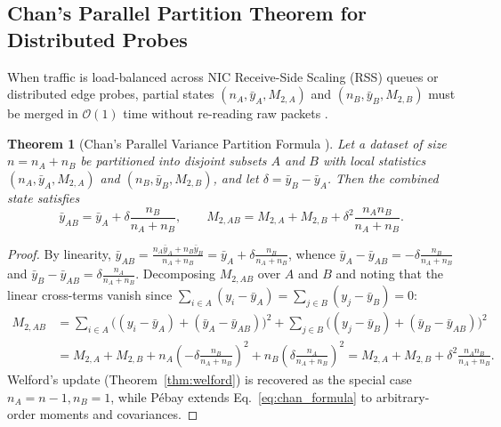 \documentclass[oneside,noexaminfo,english]{sapthesis}
\numberwithin{equation}{section}
\numberwithin{figure}{section}
\numberwithin{table}{section}
\theoremstyle{compactplain}
\newtheorem{theorem}{Theorem}[section]
\theoremstyle{compactdef}
\theoremstyle{compactrem}
\begin{document}
\subsection{Chan's Parallel Partition Theorem for Distributed Probes}
When traffic is load-balanced across NIC Receive-Side Scaling (RSS) queues or distributed edge probes, partial states $(n_A, \bar{y}_A, M_{2,A})$ and $(n_B, \bar{y}_B, M_{2,B})$ must be merged in $\mathcal{O}(1)$ time without re-reading raw packets \cite{chan1983,pebay2008}.

\begin{theorem}[Chan's Parallel Variance Partition Formula \cite{chan1983}]
\label{thm:chan}
Let a dataset of size $n = n_A + n_B$ be partitioned into disjoint subsets $A$ and $B$ with local statistics $(n_A, \bar{y}_A, M_{2,A})$ and $(n_B, \bar{y}_B, M_{2,B})$, and let $\delta = \bar{y}_B - \bar{y}_A$. Then the combined state satisfies
\begin{equation}
    \label{eq:chan_formula}
    \bar{y}_{AB} = \bar{y}_A + \delta \frac{n_B}{n_A + n_B}, \qquad
    M_{2,AB} = M_{2,A} + M_{2,B} + \delta^2 \frac{n_A n_B}{n_A + n_B}.
\end{equation}
\end{theorem}
\begin{proof}
By linearity, $\bar{y}_{AB} = \frac{n_A \bar{y}_A + n_B \bar{y}_B}{n_A + n_B} = \bar{y}_A + \delta\frac{n_B}{n_A + n_B}$, whence $\bar{y}_A - \bar{y}_{AB} = -\delta\frac{n_B}{n_A+n_B}$ and $\bar{y}_B - \bar{y}_{AB} = \delta\frac{n_A}{n_A+n_B}$. Decomposing $M_{2,AB}$ over $A$ and $B$ and noting that the linear cross-terms vanish since $\sum_{i \in A}(y_i - \bar{y}_A) = \sum_{j \in B}(y_j - \bar{y}_B) = 0$:
\begin{align*}
    M_{2,AB} &= \sum_{i \in A}\bigl((y_i - \bar{y}_A) + (\bar{y}_A - \bar{y}_{AB})\bigr)^2 + \sum_{j \in B}\bigl((y_j - \bar{y}_B) + (\bar{y}_B - \bar{y}_{AB})\bigr)^2 \\
    &= M_{2,A} + M_{2,B} + n_A\left(-\delta\frac{n_B}{n_A+n_B}\right)^2 + n_B\left(\delta\frac{n_A}{n_A+n_B}\right)^2 = M_{2,A} + M_{2,B} + \delta^2\frac{n_A n_B}{n_A+n_B}.
\end{align*}
Welford's update (Theorem~\ref{thm:welford}) is recovered as the special case $n_A = n-1, n_B = 1$, while P\'ebay \cite{pebay2008} extends Eq.~\eqref{eq:chan_formula} to arbitrary-order moments and covariances.
\end{proof}
\end{document}
